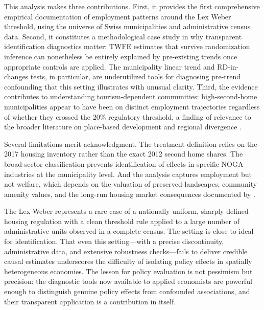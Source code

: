 \documentclass[12pt]{article}
\begin{document}
This analysis makes three contributions. First, it provides the first comprehensive empirical documentation of employment patterns around the Lex Weber threshold, using the universe of Swiss municipalities and administrative census data. Second, it constitutes a methodological case study in why transparent identification diagnostics matter: TWFE estimates that survive randomization inference can nonetheless be entirely explained by pre-existing trends once appropriate controls are applied. The municipality linear trend and RD-in-changes tests, in particular, are underutilized tools for diagnosing pre-trend confounding that this setting illustrates with unusual clarity. Third, the evidence contributes to understanding tourism-dependent communities: high-second-home municipalities appear to have been on distinct employment trajectories regardless of whether they crossed the 20\% regulatory threshold, a finding of relevance to the broader literature on place-based development and regional divergence \citep{moretti2010, hsiehmoretti2019}.

Several limitations merit acknowledgment. The treatment definition relies on the 2017 housing inventory rather than the exact 2012 second home shares. The broad sector classification prevents identification of effects in specific NOGA industries at the municipality level. And the analysis captures employment but not welfare, which depends on the valuation of preserved landscapes, community amenity values, and the long-run housing market consequences documented by \citet{hilberschoni2020}.

The Lex Weber represents a rare case of a nationally uniform, sharply defined housing regulation with a clean threshold rule applied to a large number of administrative units observed in a complete census. The setting is close to ideal for identification. That even this setting---with a precise discontinuity, administrative data, and extensive robustness checks---fails to deliver credible causal estimates underscores the difficulty of isolating policy effects in spatially heterogeneous economies. The lesson for policy evaluation is not pessimism but precision: the diagnostic tools now available to applied economists are powerful enough to distinguish genuine policy effects from confounded associations, and their transparent application is a contribution in itself.

\label{apep_main_text_end}

\newpage

\end{document}
